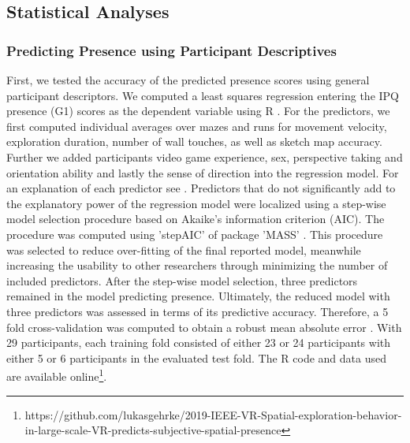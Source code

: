\subsection{Statistical Analyses}
\subsubsection{Predicting Presence using Participant Descriptives} First, we tested the accuracy of the predicted presence scores using general participant descriptors. We computed a least squares regression entering the IPQ presence (G1) scores as the dependent variable using R \cite{RFoundationforStatisticalComputing.2018}. For the predictors, we first computed individual averages over mazes and runs for movement velocity, exploration duration, number of wall touches, as well as sketch map accuracy. Further we added participants video game experience, sex, perspective taking and orientation ability and lastly the sense of direction into the regression model. For an explanation of each predictor see \cite{Gehrke2018}. Predictors that do not significantly add to the explanatory power of the regression model were localized using a step-wise model selection procedure based on Akaike's information criterion (AIC). The procedure was computed using 'stepAIC' of package 'MASS' \cite{Akaike1998a, Venables2002}. This procedure was selected to reduce over-fitting of the final reported model, meanwhile increasing the usability to other researchers through minimizing the number of included predictors. After the step-wise model selection, three predictors remained in the model predicting presence. Ultimately, the reduced model with three predictors was assessed in terms of its predictive accuracy. Therefore, a 5 fold cross-validation was computed to obtain a robust mean absolute error \cite{Mosteller1968, Furnkranz2011}. With 29 participants, each training fold consisted of either 23 or 24 participants with either 5 or 6 participants in the evaluated test fold. The R code and data used are available online\footnote{https://github.com/lukasgehrke/2019-IEEE-VR-Spatial-exploration-behavior-in-large-scale-VR-predicts-subjective-spatial-presence}.